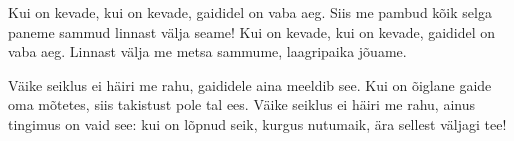 Kui on kevade, kui on kevade,
gaididel on vaba aeg.
Siis me pambud k\~oik selga paneme
sammud linnast v\"alja seame!
Kui on kevade, kui on kevade,
gaididel on vaba aeg.
Linnast v\"alja me
metsa sammume,
laagripaika j\~ouame.

V\"aike seiklus ei h\"airi me rahu,
gaididele aina meeldib see.
Kui on \~oiglane gaide oma m\~otetes,
siis takistust pole tal ees.
V\"aike seiklus ei h\"airi me rahu,
ainus tingimus on vaid see:
kui on l\~opnud seik,
kurgus nutumaik,
\"ara sellest v\"aljagi tee!